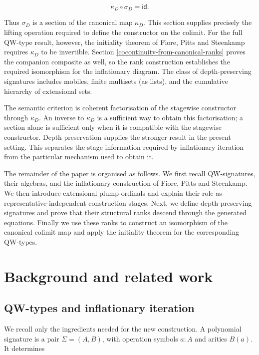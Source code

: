 \documentclass[runningheads]{llncs}
\begin{document}
\[
\kappa_D \circ \sigma_D = \mathsf{id}.
\]

Thus \(\sigma_D\) is a section of the canonical map \(\kappa_D\). This
section supplies precisely the lifting operation required to define the
constructor on the colimit. For the full QW-type result, however, the
initiality theorem of Fiore, Pitts and Steenkamp requires \(\kappa_D\) to
be invertible. Section \ref{cocontinuity-from-canonical-ranks} proves the companion composite as well, so the
rank construction establishes the required isomorphism for the
inflationary diagram. The class of depth-preserving signatures includes
mobiles, finite multisets (as lists), and the cumulative hierarchy
of extensional sets.

The semantic criterion is coherent factorisation of the stagewise
constructor through \(\kappa_D\). An inverse to \(\kappa_D\) is a
sufficient way to obtain this factorisation; a section alone is
sufficient only when it is compatible with the stagewise constructor.
Depth preservation supplies the stronger result in the present setting.
This separates the stage information required by inflationary iteration
from the particular mechanism used to obtain it.

The remainder of the paper is organised as follows. We first recall
QW-signatures, their algebras, and the inflationary construction of
Fiore, Pitts and Steenkamp. We then introduce extensional plump ordinals
and explain their role as representative-independent construction
stages. Next, we define depth-preserving signatures and prove that their
structural ranks descend through the generated equations. Finally we use these
ranks to construct an isomorphism of the canonical colimit map and apply
the initiality theorem for the corresponding QW-types.

\section{Background and related work}\label{background-and-related-work}


\subsection{QW-types and inflationary iteration}
\label{qw-types-and-inflationary-iteration}

We recall only the ingredients needed for the new construction. A
polynomial signature is a pair \(\Sigma=(A,B)\), with operation symbols
\(a:A\) and arities \(B(a)\). It determines
\end{document}
